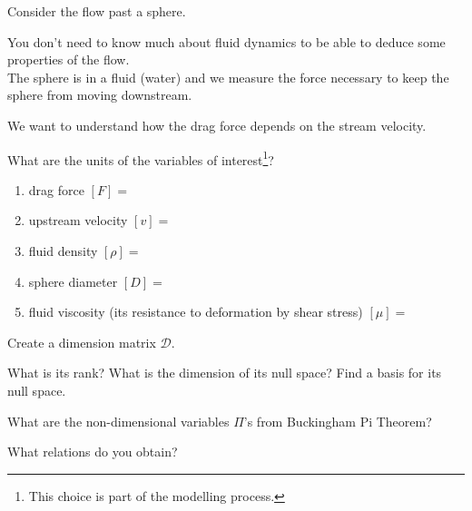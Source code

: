 \documentclass{workbook}
\begin{document}
\begin{slide}

\question

Consider the flow past a sphere.

\begin{center}
\end{center}

You don't need to know much about fluid dynamics to be able to deduce some properties of the flow. \\

The sphere is in a fluid (water) and we measure the force necessary to keep the sphere from moving downstream.

We want to understand how the drag force depends on the stream velocity.

\begin{parts}
	\item What are the units of the variables of interest\footnote{This choice is part of the modelling process.}?
	\begin{enumerate}
		\item drag force $[F]=$
		\item upstream velocity $[v]=$
		\item fluid density $[\rho]=$
		\item sphere diameter $[D]=$
		\item fluid viscosity (its resistance to deformation by shear stress) $[\mu]= $
	\end{enumerate}
	\item Create a dimension matrix $\mathcal{D}$.
	\item What is its rank? What is the dimension of its null space? Find a basis for its null space.
	\item What are the non-dimensional variables $\Pi$'s from Buckingham Pi Theorem?
	\item What relations do you obtain?
		
\end{parts}
	
\end{slide}
\end{document}
